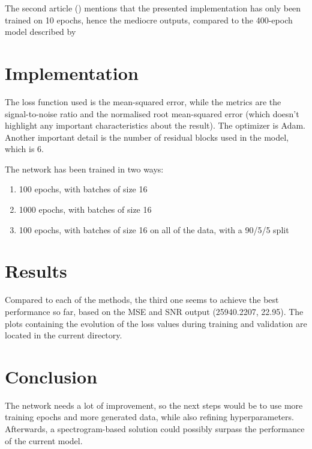 \documentclass[conference]{IEEEtran}
\begin{document}
	The second article (\textcite{hetherly2017audio}) mentions that the presented implementation has only been trained on 10 epochs, hence the mediocre outputs, compared to the 400-epoch model described by \textcite{kuleshov2017audio}


\section{Implementation}

The loss function used is the mean-squared error, while the metrics are the signal-to-noise ratio and the normalised root mean-squared error (which doesn't highlight any important characteristics about the result). The optimizer is Adam. Another important detail is the number of residual blocks used in the model, which is 6.

The network has been trained in two ways:

\begin{enumerate}
  \item 100 epochs, with batches of size 16
  \item 1000 epochs, with batches of size 16 
  \item 100 epochs, with batches of size 16 on all of the data, with a 90/5/5 split
\end{enumerate}

\section{Results}

Compared to each of the methods, the third one seems to achieve the best performance so far, based on the MSE and SNR output (25940.2207, 22.95). The plots containing the evolution of the loss values during training and validation are located in the current directory.

\section{Conclusion}
The network needs a lot of improvement, so the next steps would be to use more training epochs and more generated data, while also refining hyperparameters. Afterwards, a spectrogram-based solution could possibly surpass the performance of the current model. 

\printbibliography
\vspace{12pt}
\end{document}

